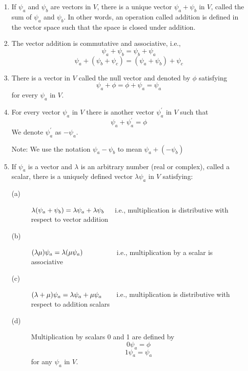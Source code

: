 \begin{enumerate}
\item  If $\psi_{a}$ and $\psi_{b}$ are vectors in $V$, there is a unique vector $\psi_{a} + \psi_{b}$ in $V$, called the sum of $\psi_{a}$ and $\psi_{b}$. In other words, an operation called addition is defined in the vector space such that the space is closed under addition.

\item  The vector addition is commutative and associative, i.e.,
$$\psi_{a} + \psi_{b} = \psi_{b} + \psi_{a}$$
$$\psi_{a} + (\psi_{b} + \psi_{c}) = (\psi_{a} + \psi_{b}) + \psi_{c}$$

\item  There is a vector in $V$ called the null vector and denoted by $\phi$ satisfying
$$\psi_{a} + \phi = \phi + \psi_{a} = \psi_a$$
for every $\psi_{a}$ in $V$.

\item  For every vector $\psi_{a}$ in $V$ there is another vector $\psi_{a}^{\prime}$ in $V$ such that
$$\psi_{a} + \psi_{a}^{\prime} = \phi$$
We denote $\psi_{a}^{\prime}$ as $-\psi_{a}$.

Note: We use the notation $\psi_{a} - \psi_{b}$ to mean $\psi_{a} + (-\psi_{b})$

\item  If $\psi_{a}$ is a vector and $\lambda$ is an arbitrary number (real or complex), called a scalar, there is a uniquely defined vector $\lambda\psi_{a}$ in $V$ satisfying:
\begin{description}
\item [(a)] $\lambda(\psi_{a} + \psi_{b}) = \lambda\psi_{a} + \lambda\psi_{b}\hspace{4mm}$ i.e., multiplication is distributive with respect to vector addition

\item [(b)] $(\lambda\mu)\psi_{a} = \lambda(\mu\psi_{a})\hspace{16mm}$ i.e., multiplication by a scalar is associative

\item [(c)] $(\lambda + \mu)\psi_{a} = \lambda\psi_{a} + \mu\psi_{a}\hspace{6mm}$ i.e., multiplication is distributive with respect to addition scalars

\item [(d)] Multiplication by scalars 0 and 1 are defined by
$$0\psi_{a} = \phi$$
$$1\psi_{a} = \psi_{a}$$
for any $\psi_{a}$ in $V$.
\end{description}
\end{enumerate}




